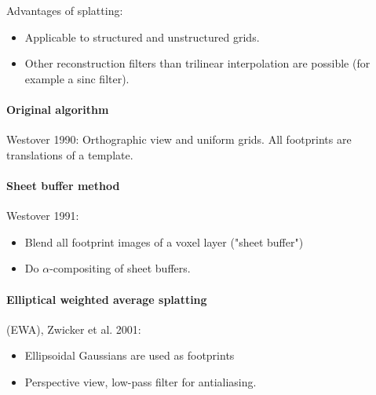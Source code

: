 Advantages of splatting:
\begin{itemize}
    \item Applicable to structured and unstructured grids.
    \item Other reconstruction filters than trilinear interpolation are possible (for example a sinc filter).
\end{itemize}

\paragraph{Original algorithm} Westover 1990: Orthographic view and uniform grids. All footprints are translations of a template.
\paragraph{Sheet buffer method} Westover 1991:
\begin{itemize}
    \item Blend all footprint images of a voxel layer ("sheet buffer")
    \item Do $\alpha$-compositing of sheet buffers.
\end{itemize}
\paragraph{Elliptical weighted average splatting} (EWA), Zwicker et al. 2001:
\begin{itemize}
    \item Ellipsoidal Gaussians are used as footprints
    \item Perspective view, low-pass filter for antialiasing.
\end{itemize}

